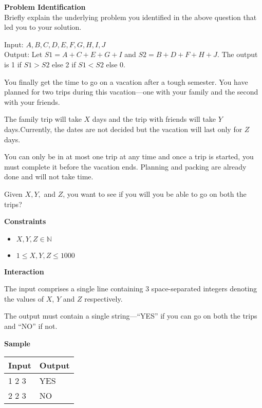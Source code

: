 \documentclass[a4paper]{exam}
\newcommand\heading[1]{\textbf{#1}}
\newcommand\inn{\in \mathbb{N}}
\begin{document}
\begin{questions}
    \heading{Problem Identification}\\
    Briefly explain the underlying problem you identified in the above question that led you to your solution.

  \begin{mdframed}
    Input: $A,B,C,D,E,F,G,H,I,J$\\
    Output: Let $S1=A+C+E+G+I$ and $S2=B+D+F+H+J$. The output is 1 if $S1>S2$ else 2 if $S1<S2$ else 0.
  \end{mdframed}


      You finally get the time to go on a vacation after a tough semester. You have planned for two trips during this vacation---one with your family and the second with your friends.
      
    The family trip will take $X$ days and the trip with friends will take $Y$ days.Currently, the dates are not decided but the vacation will last only for $Z$ days.

    You can only be in at most one trip at any time and once a trip is started, you must complete it before the vacation ends. Planning and packing are already done and will not take time.

    Given $X,Y,$ and $Z$, you want to see if you will you be able to go on both the trips?

    \heading{Constraints}
    \begin{itemize}
        \item  $X,Y,Z\inn$
        \item  $1\le X,Y,Z\le1000$
    \end{itemize}


    \heading{Interaction}

    The input comprises a single line containing 3 space-separated integers denoting the values of $X$, $Y$ and $Z$ respectively.

    The output must contain a single string---``YES'' if you can go on both the trips and ``NO'' if not.

    \heading{Sample}

    \begin{tabularx}{\textwidth}{|X|X|}
        \rowcolor{gray!50}
        \hline
        Input & Output \\ \hline\hline
        1 2 3 & YES    \\\hline
        2 2 3 & NO     \\\hline
    \end{tabularx}


\end{questions}
\end{document}
